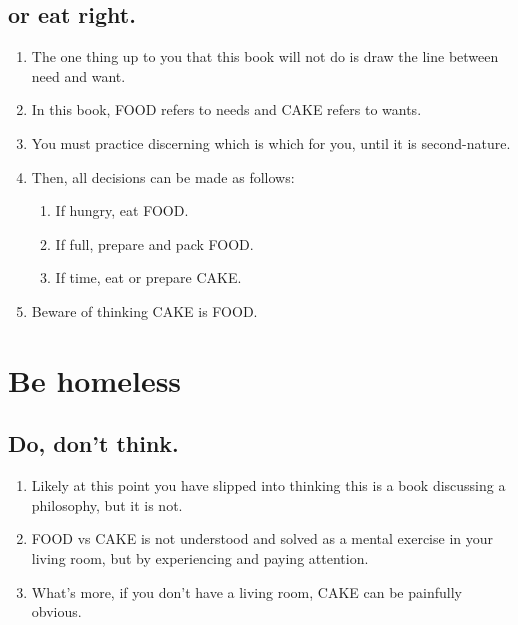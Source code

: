 \documentclass[
]{book}
\providecommand{\tightlist}{%
  \setlength{\itemsep}{0pt}\setlength{\parskip}{0pt}}
\begin{document}
\hypertarget{or-eat-right.}{%
\subsection{or eat right.}\label{or-eat-right.}}

\begin{enumerate}
\def\labelenumi{\arabic{enumi}.}
\setcounter{enumi}{22}
\tightlist
\item
  The one thing up to you that this book will not do is draw the line between need and want.
\item
  In this book, FOOD refers to needs and CAKE refers to wants.
\item
  You must practice discerning which is which for you, until it is second-nature.
\item
  Then, all decisions can be made as follows:

  \begin{enumerate}
  \def\labelenumii{\arabic{enumii}.}
  \tightlist
  \item
    If hungry, eat FOOD.
  \item
    If full, prepare and pack FOOD.
  \item
    If time, eat or prepare CAKE.
  \end{enumerate}
\item
  Beware of thinking CAKE is FOOD.
\end{enumerate}

\hypertarget{be-homeless}{%
\section{Be homeless}\label{be-homeless}}

\hypertarget{do-dont-think.}{%
\subsection{Do, don't think.}\label{do-dont-think.}}

\begin{enumerate}
\def\labelenumi{\arabic{enumi}.}
\setcounter{enumi}{25}
\tightlist
\item
  Likely at this point you have slipped into thinking this is a book discussing a philosophy, but it is not.
\item
  FOOD vs CAKE is not understood and solved as a mental exercise in your living room, but by experiencing and paying attention.
\item
  What's more, if you don't have a living room, CAKE can be painfully obvious.
\end{enumerate}
\end{document}
